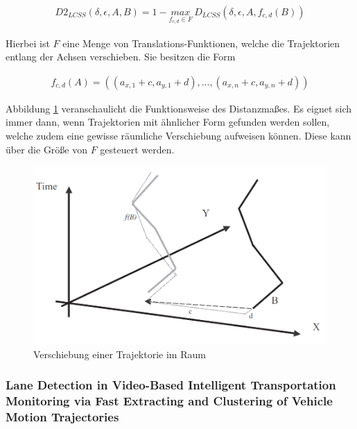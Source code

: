 \begin{ceqn}
\begin{align}
    D2_{LCSS}(\delta, \epsilon, A, B) = 1 - \underset{f_{c,d} \in F}{max}\ D_{LCSS}(\delta, \epsilon, A, f_{c,d}(B))
\end{align}
\end{ceqn}

Hierbei ist $F$ eine Menge von Translations-Funktionen, welche die Trajektorien entlang der Achsen verschieben.
Sie besitzen die Form

\begin{ceqn}
\begin{align}
    f_{c, d}(A) = ((a_{x, 1} + c, a_{y, 1} + d), ..., (a_{x, n} + c, a_{y, n} + d))
\end{align}
\end{ceqn}

Abbildung \ref{fig:relw_vlachos_translation} veranschaulicht die Funktionsweise des Distanzmaßes. Es eignet sich immer dann, wenn Trajektorien
mit ähnlicher Form gefunden werden sollen, welche zudem eine gewisse räumliche Verschiebung aufweisen können.
Diese kann über die Größe von $F$ gesteuert werden.

\begin{figure}[H]
    \centering
    \includegraphics[width=0.55\linewidth]{../resources/img/RelatedWork/vlachos_translation}
    \caption[Verschiebung einer Trajektorie im Raum]{Verschiebung einer Trajektorie im Raum \cite[]{Vlachos2002}}
    \label{fig:relw_vlachos_translation}
\end{figure}

\subsubsection*{Lane Detection in Video-Based Intelligent Transportation Monitoring via Fast Extracting and Clustering of Vehicle Motion Trajectories}

